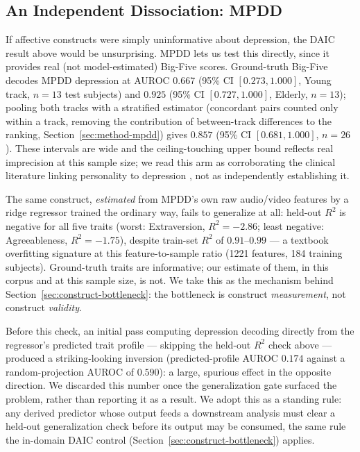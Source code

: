 \documentclass[letterpaper]{article}
\begin{document}
\subsection{An Independent Dissociation: MPDD}
\label{sec:mpdd-dissociation}

If affective constructs were simply uninformative about depression, the DAIC result above would be unsurprising. MPDD \citep{fu2025mpdd} lets us test this directly, since it provides real (not model-estimated) Big-Five scores. Ground-truth Big-Five decodes MPDD depression at AUROC $0.667$ (95\% CI $[0.273, 1.000]$, Young track, $n{=}13$ test subjects) and $0.925$ (95\% CI $[0.727, 1.000]$, Elderly, $n{=}13$); pooling both tracks with a stratified estimator (concordant pairs counted only within a track, removing the contribution of between-track differences to the ranking, Section~\ref{sec:method-mpdd}) gives $0.857$ (95\% CI $[0.681, 1.000]$, $n{=}26$). These intervals are wide and the ceiling-touching upper bound reflects real imprecision at this sample size; we read this arm as corroborating the clinical literature linking personality to depression \citep{kotov2010linking}, not as independently establishing it.

The same construct, \emph{estimated} from MPDD's own raw audio/video features by a ridge regressor trained the ordinary way, fails to generalize at all: held-out $R^2$ is negative for all five traits (worst: Extraversion, $R^2{=}-2.86$; least negative: Agreeableness, $R^2{=}-1.75$), despite train-set $R^2$ of $0.91$--$0.99$ — a textbook overfitting signature at this feature-to-sample ratio (1221 features, 184 training subjects). Ground-truth traits are informative; our estimate of them, in this corpus and at this sample size, is not. We take this as the mechanism behind Section~\ref{sec:construct-bottleneck}: the bottleneck is construct \emph{measurement}, not construct \emph{validity}.

Before this check, an initial pass computing depression decoding directly from the regressor's predicted trait profile — skipping the held-out $R^2$ check above — produced a striking-looking inversion (predicted-profile AUROC $0.174$ against a random-projection AUROC of $0.590$): a large, spurious effect in the opposite direction. We discarded this number once the generalization gate surfaced the problem, rather than reporting it as a result. We adopt this as a standing rule: any derived predictor whose output feeds a downstream analysis must clear a held-out generalization check before its output may be consumed, the same rule the in-domain DAIC control (Section~\ref{sec:construct-bottleneck}) applies.
\end{document}
